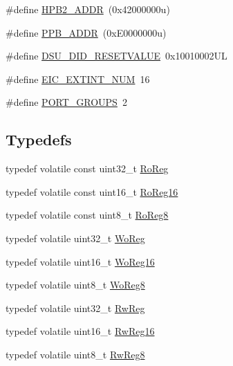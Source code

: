 \begin{DoxyCompactItemize}
\item 
\#define \mbox{\hyperlink{group___s_a_m_d21_j16_a__definitions_gaef42fa53ddf169a2a50be70d29f73571}{H\+P\+B2\+\_\+\+A\+D\+DR}}~(0x42000000u)
\item 
\#define \mbox{\hyperlink{group___s_a_m_d21_j16_a__definitions_ga8895d0a3a9a3126cc44330f86c8ce564}{P\+P\+B\+\_\+\+A\+D\+DR}}~(0x\+E0000000u)
\item 
\#define \mbox{\hyperlink{group___s_a_m_d21_j16_a__definitions_gada75131d542c9e1966238f5488f89bd6}{D\+S\+U\+\_\+\+D\+I\+D\+\_\+\+R\+E\+S\+E\+T\+V\+A\+L\+UE}}~0x10010002\+UL
\item 
\#define \mbox{\hyperlink{group___s_a_m_d21_j16_a__definitions_ga88ebc38c95506296f5d21f82476296ae}{E\+I\+C\+\_\+\+E\+X\+T\+I\+N\+T\+\_\+\+N\+UM}}~16
\item 
\#define \mbox{\hyperlink{group___s_a_m_d21_j16_a__definitions_gab9243ffe03a1dc631b57a495b4b3d467}{P\+O\+R\+T\+\_\+\+G\+R\+O\+U\+PS}}~2
\end{DoxyCompactItemize}
\subsection*{Typedefs}
\begin{DoxyCompactItemize}
\item 
typedef volatile const uint32\+\_\+t \mbox{\hyperlink{group___s_a_m_d21_j16_a__definitions_ga5d556f8391af4141be23f7334ac9dd68}{Ro\+Reg}}
\item 
typedef volatile const uint16\+\_\+t \mbox{\hyperlink{group___s_a_m_d21_j16_a__definitions_gaebf6e33c2d49a802e06e22a95ea9d0d0}{Ro\+Reg16}}
\item 
typedef volatile const uint8\+\_\+t \mbox{\hyperlink{group___s_a_m_d21_j16_a__definitions_ga0d957f1433aaf5d70e4dc2b68288442d}{Ro\+Reg8}}
\item 
typedef volatile uint32\+\_\+t \mbox{\hyperlink{group___s_a_m_d21_j16_a__definitions_gac0f96d4e8018367b38f527007cf0eafd}{Wo\+Reg}}
\item 
typedef volatile uint16\+\_\+t \mbox{\hyperlink{group___s_a_m_d21_j16_a__definitions_ga0ab0e5f6c8301aa1c2068e511d854094}{Wo\+Reg16}}
\item 
typedef volatile uint8\+\_\+t \mbox{\hyperlink{group___s_a_m_d21_j16_a__definitions_ga5e336e5a36ee12ebeafb021108e5275b}{Wo\+Reg8}}
\item 
typedef volatile uint32\+\_\+t \mbox{\hyperlink{group___s_a_m_d21_j16_a__definitions_gacf1496e3bbe303e55f627fc7558a68c7}{Rw\+Reg}}
\item 
typedef volatile uint16\+\_\+t \mbox{\hyperlink{group___s_a_m_d21_j16_a__definitions_gacce07556c80fc352ae607f225f19fed5}{Rw\+Reg16}}
\item 
typedef volatile uint8\+\_\+t \mbox{\hyperlink{group___s_a_m_d21_j16_a__definitions_gae361754be775bb192f85821d3ab33c17}{Rw\+Reg8}}
\end{DoxyCompactItemize}


